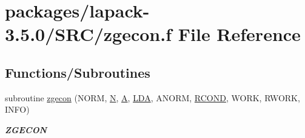 \hypertarget{zgecon_8f}{}\section{packages/lapack-\/3.5.0/\+S\+R\+C/zgecon.f File Reference}
\label{zgecon_8f}
\subsection*{Functions/\+Subroutines}
\begin{DoxyCompactItemize}
\item 
subroutine \hyperlink{group__complex16GEcomputational_gabe73145daeba3ec10e961054b75a07ce}{zgecon} (N\+O\+R\+M, \hyperlink{polmisc_8c_a0240ac851181b84ac374872dc5434ee4}{N}, \hyperlink{classA}{A}, \hyperlink{example__user_8c_ae946da542ce0db94dced19b2ecefd1aa}{L\+D\+A}, A\+N\+O\+R\+M, \hyperlink{superlu__enum__consts_8h_af00a42ecad444bbda75cde1b64bd7e72a9b5c151728d8512307565994c89919d5}{R\+C\+O\+N\+D}, W\+O\+R\+K, R\+W\+O\+R\+K, I\+N\+F\+O)
\begin{DoxyCompactList}\small\item\em {\bfseries Z\+G\+E\+C\+O\+N} \end{DoxyCompactList}\end{DoxyCompactItemize}
